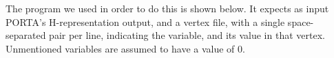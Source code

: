 The program we used in order to do this is shown below. It expects as input PORTA's H-representation output, and a vertex file, with a single space-separated pair per line, indicating the variable, and its value in that vertex. Unmentioned variables are assumed to have a value of $0$.

\newpage

\inputminted[fontsize=\footnotesize]{haskell}{chapters/5/valid_facet.hs}

